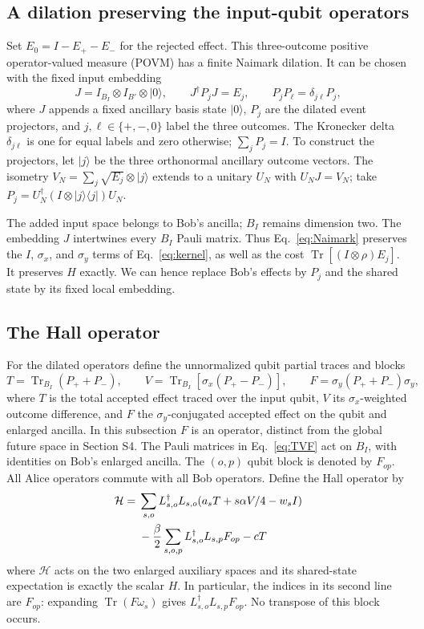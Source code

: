 \documentclass[11pt]{article}
\newcommand{\Tr}{\operatorname{Tr}}
\begin{document}
\subsection{A dilation preserving the input-qubit operators}
Set $E_0=I-E_+-E_-$ for the rejected effect. This three-outcome positive operator-valued measure (POVM) has a finite Naimark dilation. It can be chosen with the fixed input embedding
\begin{equation}
 J=I_{B_I}\otimes I_{B'}\otimes|0\rangle,\qquad
 J^\dagger P_jJ=E_j,\qquad P_jP_\ell=\delta_{j\ell}P_j,
 \label{eq:Naimark}
\end{equation}
where $J$ appends a fixed ancillary basis state $|0\rangle$, $P_j$ are the dilated event projectors, and $j,\ell\in\{+,-,0\}$ label the three outcomes. The Kronecker delta $\delta_{j\ell}$ is one for equal labels and zero otherwise; $\sum_jP_j=I$. To construct the projectors, let $|j\rangle$ be the three orthonormal ancillary outcome vectors. The isometry $V_N=\sum_j\sqrt{E_j}\otimes|j\rangle$ extends to a unitary $U_N$ with $U_NJ=V_N$; take $P_j=U_N^\dagger(I\otimes|j\rangle\langle j|)U_N$.

The added input space belongs to Bob's ancilla; $B_I$ remains dimension two. The embedding $J$ intertwines every $B_I$ Pauli matrix. Thus Eq.~\eqref{eq:Naimark} preserves the $I$, $\sigma_x$, and $\sigma_y$ terms of Eq.~\eqref{eq:kernel}, as well as the cost $\Tr[(I\otimes\rho)E_j]$. It preserves $H$ exactly. We can hence replace Bob's effects by $P_j$ and the shared state by its fixed local embedding.

\subsection{The Hall operator}
For the dilated operators define the unnormalized qubit partial traces and blocks
\begin{equation}
 T=\Tr_{B_I}(P_++P_-),\qquad
 V=\Tr_{B_I}[\sigma_x(P_+-P_-)],\qquad
 F=\sigma_y(P_++P_-)\sigma_y,
 \label{eq:TVF}
\end{equation}
where $T$ is the total accepted effect traced over the input qubit, $V$ its $\sigma_x$-weighted outcome difference, and $F$ the $\sigma_y$-conjugated accepted effect on the qubit and enlarged ancilla. In this subsection $F$ is an operator, distinct from the global future space in Section S4. The Pauli matrices in Eq.~\eqref{eq:TVF} act on $B_I$, with identities on Bob's enlarged ancilla. The $(o,p)$ qubit block is denoted by $F_{op}$. All Alice operators commute with all Bob operators. Define the Hall operator by
\begin{align}
 \mathcal H={}&\sum_{s,o}L_{s,o}^\dagger L_{s,o}
          (a_sT+s\alpha V/4-w_sI)\notag\\
 &-\frac\beta2\sum_{s,o,p}L_{s,o}^\dagger L_{s,p}F_{op}-cT
 \label{eq:operator-H}
\end{align}
where $\mathcal H$ acts on the two enlarged auxiliary spaces and its shared-state expectation is exactly the scalar $H$. In particular, the indices in its second line are $F_{op}$: expanding $\Tr(F\omega_s)$ gives $L_{s,o}^\dagger L_{s,p}F_{op}$. No transpose of this block occurs.
\end{document}
